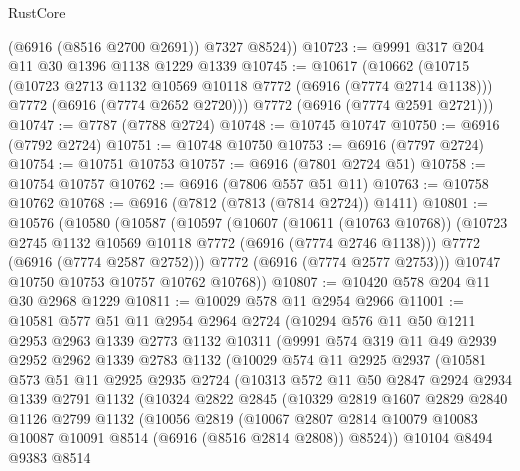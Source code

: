 \begin{lexlean}{RustCore}
\begin{coremodule}
        (@6916 (@8516 @2700 @2691))
        @7327
        @8524))
@10723 := @9991 @317 @204 @11 @30 @1396 @1138 @1229 @1339
@10745 := @10617
    (@10662
      (@10715
        (@10723 @2713 @1132 @10569 @10118 @7772 (@6916 (@7774 @2714 @1138)))
        @7772
        (@6916 (@7774 @2652 @2720)))
      @7772
      (@6916 (@7774 @2591 @2721)))
@10747 := @7787 (@7788 @2724)
@10748 := @10745 @10747
@10750 := @6916 (@7792 @2724)
@10751 := @10748 @10750
@10753 := @6916 (@7797 @2724)
@10754 := @10751 @10753
@10757 := @6916 (@7801 @2724 @51)
@10758 := @10754 @10757
@10762 := @6916 (@7806 @557 @51 @11)
@10763 := @10758 @10762
@10768 := @6916 (@7812 (@7813 (@7814 @2724)) @1411)
@10801 := @10576
    (@10580
      (@10587
        (@10597
          (@10607
            (@10611 (@10763 @10768))
            (@10723 @2745 @1132 @10569 @10118 @7772 (@6916 (@7774 @2746 @1138)))
            @7772
            (@6916 (@7774 @2587 @2752)))
          @7772
          (@6916 (@7774 @2577 @2753)))
        @10747
        @10750
        @10753
        @10757
        @10762
        @10768))
@10807 := @10420 @578 @204 @11 @30 @2968 @1229
@10811 := @10029 @578 @11 @2954 @2966
@11001 := @10581
    @577
    @51
    @11
    @2954
    @2964
    @2724
    (@10294
      @576
      @11
      @50
      @1211
      @2953
      @2963
      @1339
      @2773
      @1132
      @10311
      (@9991
        @574
        @319
        @11
        @49
        @2939
        @2952
        @2962
        @1339
        @2783
        @1132
        (@10029
          @574
          @11
          @2925
          @2937
          (@10581
            @573
            @51
            @11
            @2925
            @2935
            @2724
            (@10313
              @572
              @11
              @50
              @2847
              @2924
              @2934
              @1339
              @2791
              @1132
              (@10324
                @2822
                @2845
                (@10329
                  @2819
                  @1607
                  @2829
                  @2840
                  @1126
                  @2799
                  @1132
                  (@10056
                    @2819
                    (@10067
                      @2807
                      @2814
                      @10079
                      @10083
                      @10087
                      @10091
                      @8514
                      (@6916 (@8516 @2814 @2808))
                      @8524))
                  @10104
                  @8494
                  @9383
                  @8514

\end{coremodule}
\end{lexlean}
